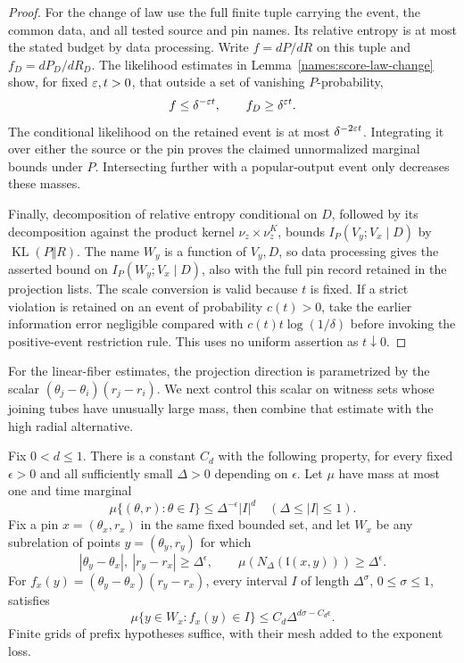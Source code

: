 \begin{proof}
For the change of law use the full finite tuple carrying the
event, the common data, and all tested source and pin names.
Its relative entropy is at most the stated budget by data
processing. Write \(f=dP/dR\) on this tuple and
\(f_D=dP_D/dR_D\). The likelihood estimates in
Lemma~\ref{names:score-law-change} show, for fixed
\(\varepsilon,t>0\), that outside a set of vanishing \(P\)-probability,
\[
 f\leq\delta^{-\varepsilon t},\qquad f_D\geq\delta^{\varepsilon t}.
\]
The conditional likelihood on the retained event is at most
\(\delta^{-2\varepsilon t}\). Integrating it over either the source
or the pin proves the claimed unnormalized marginal bounds
under \(P\). Intersecting further with a popular-output event
only decreases these masses.

Finally, decomposition of relative entropy conditional on \(D\),
followed by its decomposition against the product kernel
\(\nu_z\times\nu_z^K\), bounds
\(I_P(V_y;V_x\mid D)\) by
\(\operatorname{KL}(P\Vert R)\). The name \(W_y\) is a function of
\(V_y,D\), so data processing gives the asserted bound on
\(I_P(W_y;V_x\mid D)\), also with the full pin record
retained in the projection lists. The scale conversion is valid
because \(t\) is fixed. If a strict violation is retained on an
event of probability \(c(t)>0\), take the earlier information
error negligible compared with
\(c(t)t\log(1/\delta)\) before invoking the positive-event
restriction rule. This uses no uniform assertion as
\(t\downarrow0\).
\end{proof}

For the linear-fiber estimates, the projection direction is parametrized
by the scalar $(\theta_j-\theta_i)(r_j-r_i)$. We next control this
scalar on witness sets whose joining tubes have unusually large mass,
then combine that estimate with the high radial alternative.

\begin{lemma}\label{names:radial-low-product}
Fix $0<d\leq1$.  There is a constant $C_d$ with the following
property, for every fixed $\epsilon>0$ and all sufficiently
small $\Delta>0$ depending on $\epsilon$.  Let $\mu$ have
mass at most one and time marginal
\[
 \mu\{(\theta,r):\theta\in I\}
           \leq\Delta^{-\epsilon}|I|^d
 \quad(\Delta\leq|I|\leq1).
\]
Fix a pin $x=(\theta_x,r_x)$ in the same fixed bounded set,
and let $W_x$ be any subrelation
of points $y=(\theta_y,r_y)$ for which
\[
 |\theta_y-\theta_x|,\ |r_y-r_x|\geq\Delta^\epsilon,
 \qquad
 \mu(N_\Delta(\mathfrak l(x,y)))\geq\Delta^\epsilon.
\]
For $f_x(y)=(\theta_y-\theta_x)(r_y-r_x)$, every interval
$I$ of length $\Delta^\sigma$, $0\leq\sigma\leq1$, satisfies
\begin{equation}\label{names:radial-low-product-bound}
 \mu\{y\in W_x:f_x(y)\in I\}
            \leq C_d\Delta^{d\sigma-C_d\epsilon}.
\end{equation}
Finite grids of prefix hypotheses suffice, with their mesh
added to the exponent loss.
\end{lemma}

